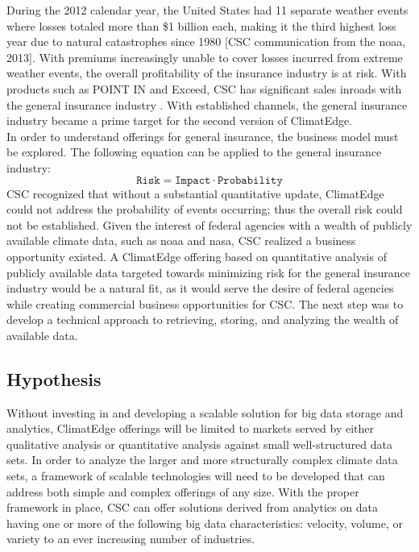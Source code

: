 During the 2012 calendar year, the United States had 11 separate weather events where losses totaled more than \$1 billion each, making it the third highest loss year due to natural catastrophes since 1980 [\textsc{CSC} communication from the \gls{noaa}, 2013]. With premiums increasingly unable to cover losses incurred from extreme weather events, the overall profitability of the insurance industry is at risk. With products such as POINT IN and Exceed, \textsc{CSC} has significant sales inroads with the general insurance industry \cite{point_in} \cite{exceed}. With established channels, the general insurance industry became a prime target for the second version of ClimatEdge.\\

In order to understand offerings for general insurance, the business model must be explored. The following equation can be applied to the general insurance industry: 
\begin{equation*}
\texttt{Risk} = \texttt{Impact} \cdot \texttt{Probability}
\end{equation*}
\textsc{CSC} recognized that without a substantial quantitative update, ClimatEdge could not address the probability of events occurring; thus the overall risk could not be established. Given the interest of federal agencies with a wealth of publicly available climate data, such as \gls{noaa} and \gls{nasa}, \textsc{CSC} realized a business opportunity existed. A ClimatEdge offering based on quantitative analysis of publicly available data targeted towards minimizing risk for the general insurance industry would be a natural fit, as it would serve the desire of federal agencies while creating commercial business opportunities for \textsc{CSC}. The next step was to develop a technical approach to retrieving, storing, and analyzing the wealth of available data. 
\subsection{Hypothesis}
Without investing in and developing a scalable solution for big data  storage and analytics, ClimatEdge offerings will be limited to markets served by either qualitative analysis or quantitative analysis against small well-structured data sets. In order to analyze the larger and more structurally complex climate data sets, a framework of scalable technologies will need to be developed that can address both simple and complex offerings of any size. With the proper framework in place, \textsc{CSC} can offer solutions derived from analytics on data having one or more of the following big data characteristics: velocity, volume, or variety to an ever increasing number of industries.\\
 
